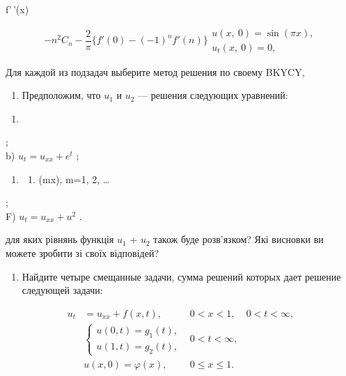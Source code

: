 \documentclass[
  ukrainian,
]{article}
\providecommand{\tightlist}{%
  \setlength{\itemsep}{0pt}\setlength{\parskip}{0pt}}
\begin{document}
f'\,'(x)

\[
-n^{2}C_{n} - \frac{2}{\pi} \{f'(0) - (-1)^{n} f'(n)\}
\begin{aligned} u\left(x, \ 0\right) = \sin{(\pi x)}, \\ u_{t}\left(x, \ 0\right) = 0, \end{aligned}
\]

Для каждой из подзадач выберите метод решения по своему BKYCY,

\begin{enumerate}
\def\labelenumi{\arabic{enumi}.}
\setcounter{enumi}{2}
\tightlist
\item
  Предположим, что \(u_1\) и \(u_2\) --- решения следующих уравнений:
\end{enumerate}

\begin{enumerate}
\def\labelenumi{\alph{enumi})}
\tightlist
\item
\end{enumerate}

;\\
b) \(u_t = u_{xx} + e^t\) ;

\begin{enumerate}
\def\labelenumi{\Alph{enumi})}
\setcounter{enumi}{1}
\tightlist
\item
  \begin{enumerate}
  \def\labelenumii{\arabic{enumii}.}
  \setcounter{enumii}{4}
  \tightlist
  \item
    \cos(mx), m=1, 2, \dots
  \end{enumerate}
\end{enumerate}

;\\
F) \(u_t = u_{xx} + u^2\) .

\mathbf{\Pi} для яких рівнянь функція \(u_1\) + \(u_2\) також буде
розв'язком? Які висновки ви можете зробити зі своїх відповідей?

\begin{enumerate}
\def\labelenumi{\arabic{enumi}.}
\setcounter{enumi}{3}
\tightlist
\item
  Найдите четыре смещанные задачи, сумма решений которых дает решение
  следующей задачи:
\end{enumerate}

\[
\begin{aligned} u_t &= u_{xx} + f(x, t), & 0 < x < 1, & 0 < t < \infty, \\ & \begin{cases} u(0, t) = g_1(t), \\ u(1, t) = g_2(t), \end{cases} & 0 < t < \infty, \\ & u(x, 0) = \varphi(x), & 0 \le x \le 1. \end{aligned}
\]
\end{document}

